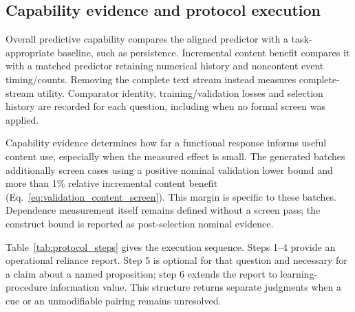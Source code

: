 \subsection{Capability evidence and protocol execution}
\label{sec:protocol_execution}

Overall predictive capability compares the aligned predictor with a task-appropriate baseline, such as persistence. Incremental content benefit compares it with a matched predictor retaining numerical history and noncontent event timing/counts. Removing the complete text stream instead measures complete-stream utility. Comparator identity, training/validation losses and selection history are recorded for each question, including when no formal screen was applied.

Capability evidence determines how far a functional response informs useful content use, especially when the measured effect is small. The generated batches additionally screen cases using a positive nominal validation lower bound and more than 1\% relative incremental content benefit (Eq.~\ref{eq:validation_content_screen}). This margin is specific to these batches. Dependence measurement itself remains defined without a screen pass; the construct bound is reported as post-selection nominal evidence.

Table~\ref{tab:protocol_steps} gives the execution sequence. Steps 1--4 provide an operational reliance report. Step 5 is optional for that question and necessary for a claim about a named proposition; step 6 extends the report to learning-procedure information value. This structure returns separate judgments when a cue or an unmodifiable pairing remains unresolved.

